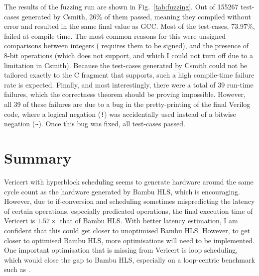 The results of the fuzzing run are shown in Fig.~\ref{tab:fuzzing}.  Out of
155267 test-cases generated by Csmith, 26\% of them passed, meaning they
compiled without error and resulted in the same final value as GCC. Most of the
test-cases, 73.97\%, failed at compile time.  The most common reasons for this
were unsigned comparisons between integers (\vericert{} requires them to be
signed), and the presence of 8-bit operations (which \vericert{} does not
support, and which I could not turn off due to a limitation in Csmith).  Because
the test-cases generated by Csmith could not be tailored exactly to the C
fragment that \vericert{} supports, such a high compile-time failure rate is
expected. Finally, and most interestingly, there were a total of 39 run-time
failures, which the correctness theorem should be proving impossible.  However,
all 39 of these failures are due to a bug in the pretty-printing of the final
Verilog code, where a logical negation (\texttt{!}) was accidentally used
instead of a bitwise negation (\verb|~|).  Once this bug was fixed, all
test-cases passed.

\section{Summary}

Vericert with hyperblock scheduling seems to generate hardware around the same
cycle count as the hardware generated by Bambu HLS, which is encouraging.
However, due to if-conversion and scheduling sometimes mispredicting the latency
of certain operations, especially predicated operations, the final execution
time of Vericert is $1.57\times$ that of Bambu HLS.  With better latency
estimation, I am confident that this could get closer to unoptimised Bambu HLS.
However, to get closer to optimised Bambu HLS, more optimisations will need to
be implemented.  One important optimisation that is missing from Vericert is
loop scheduling, which would close the gap to Bambu HLS, especially on a
loop-centric benchmark such as \polybench{}.


